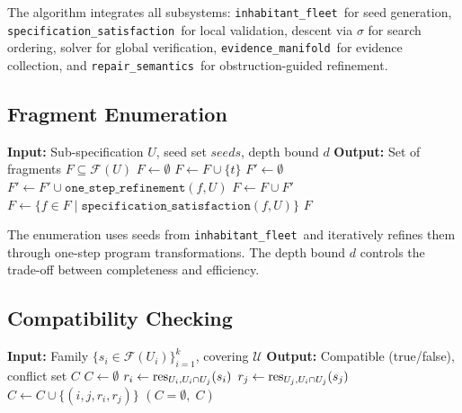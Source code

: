 \documentclass[11pt]{article}
\newcommand{\FragmentSpace}{\mathcal{F}}
\newcommand{\SpecSat}{\texttt{specification\_satisfaction}}
\newcommand{\InhabFleet}{\texttt{inhabitant\_fleet}}
\newcommand{\EvidManifold}{\texttt{evidence\_manifold}}
\newcommand{\RepairSem}{\texttt{repair\_semantics}}
\begin{document}
The algorithm integrates all subsystems: \InhabFleet\ for seed
generation, \SpecSat\ for local validation, descent via
$\sigma$ for search ordering, solver for global verification,
\EvidManifold\ for evidence collection, and \RepairSem\ for
obstruction-guided refinement.

\subsection{Fragment Enumeration}

\begin{algorithm}[H]
\caption{Fragment Enumeration for a Patch}
\label{alg:fragment-enum}
\begin{algorithmic}[1]
\STATE \textbf{Input:} Sub-specification $U$, seed set
       $\textit{seeds}$, depth bound $d$
\STATE \textbf{Output:} Set of fragments $F \subseteq \FragmentSpace(U)$
\STATE $F \gets \emptyset$
    \STATE $F \gets F \cup \{t\}$
  \ENDIF
\ENDFOR
{}
  \STATE $F' \gets \emptyset$
    \STATE $F' \gets F' \cup
           \texttt{one\_step\_refinement}(f, U)$
  \ENDFOR
  \STATE $F \gets F \cup F'$
\ENDFOR
\STATE $F \gets \{f \in F \mid
       \texttt{specification\_satisfaction}(f, U)\}$
\RETURN $F$
\end{algorithmic}
\end{algorithm}

The enumeration uses seeds from \InhabFleet\ and iteratively
refines them through one-step program transformations.  The
depth bound $d$ controls the trade-off between completeness
and efficiency.

\subsection{Compatibility Checking}

\begin{algorithm}[H]
\caption{Compatibility Check for Fragment Family}
\label{alg:compat-check}
\begin{algorithmic}[1]
\STATE \textbf{Input:} Family $\{s_i \in \FragmentSpace(U_i)\}_{i=1}^k$,
       covering $\mathcal{U}$
\STATE \textbf{Output:} Compatible (true/false), conflict set $C$
\STATE $C \gets \emptyset$
      \STATE $r_i \gets \mathrm{res}_{U_i, U_i \cap U_j}(s_i)$
      \STATE $r_j \gets \mathrm{res}_{U_j, U_i \cap U_j}(s_j)$
        \STATE $C \gets C \cup \{(i, j, r_i, r_j)\}$
      \ENDIF
    \ENDIF
  \ENDFOR
\ENDFOR
\RETURN $(C = \emptyset, \; C)$
\end{algorithmic}
\end{algorithm}
\end{document}
